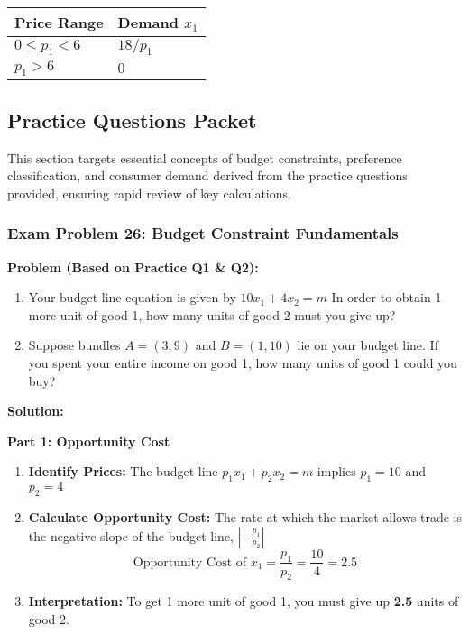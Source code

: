 \documentclass{article}
\begin{document}
\begin{table}[h!]
\centering
\begin{tabular}{ll}
\toprule
\textbf{Price Range} & \textbf{Demand $x_1$} \\
\midrule
$0 \leq p_1 < 6$ & $18/p_1$ \\
$p_1 > 6$ & $0$ \\
\bottomrule

\end{tabular}

\end{table}

\subsection{Practice Questions Packet}

This section targets essential concepts of budget constraints, preference classification, and consumer demand derived from the practice questions provided, ensuring rapid review of key calculations.

\subsubsection*{Exam Problem 26: Budget Constraint Fundamentals}

\textbf{Problem (Based on Practice Q1 \& Q2):}
\begin{enumerate}
    \item Your budget line equation is given by $10x_1 + 4x_2 = m$ In order to obtain 1 more unit of good 1, how many units of good 2 must you give up?
    \item Suppose bundles $A=(3, 9)$ and $B=(1, 10)$ lie on your budget line. If you spent your entire income on good 1, how many units of good 1 could you buy?
\end{enumerate}

\textbf{Solution:}

\textbf{Part 1: Opportunity Cost}
\begin{enumerate}
    \item \textbf{Identify Prices:} The budget line $p_1 x_1 + p_2 x_2 = m$ implies $p_1=10$ and $p_2=4$
    \item \textbf{Calculate Opportunity Cost:} The rate at which the market allows trade is the negative slope of the budget line, $|-\frac{p_1}{p_2}|$
    \[\text{Opportunity Cost of } x_1 = \frac{p_1}{p_2} = \frac{10}{4} = 2.5\]
    \item \textbf{Interpretation:} To get 1 more unit of good 1, you must give up \textbf{2.5} units of good 2.
\end{enumerate}
\end{document}

